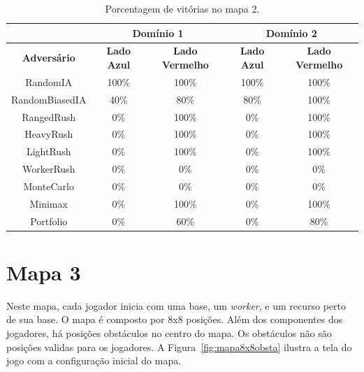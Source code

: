 \begin{table}[ht]
	\centering
	\caption{Porcentagem de vitórias no mapa 2.}
	\label{tab:mapa2}
	\begin{tabular}{|c|cc|cc|}
		\hline
		\textbf{}           & \multicolumn{2}{c|}{\textbf{Domínio 1}}  & \multicolumn{2}{c|}{\textbf{Domínio 2}}  \\ \hline
		\textbf{Adversário} & \textbf{Lado Azul} & \textbf{Lado Vermelho} & \textbf{Lado Azul} & \textbf{Lado Vermelho} \\ \hline
		RandomIA            & 100\%              & 100\%                  & 100\%              & 100\%                  \\ \hline
		RandomBiasedIA      & 40\%               & 80\%                   & 80\%               & 100\%                  \\ \hline
		RangedRush          & 0\%                & 100\%                  & 0\%                & 100\%                  \\ \hline
		HeavyRush           & 0\%                & 100\%                  & 0\%                & 100\%                  \\ \hline
		LightRush           & 0\%                & 100\%                  & 0\%                & 100\%                  \\ \hline
		WorkerRush          & 0\%                & 0\%                    & 0\%                & 0\%                    \\ \hline
		MonteCarlo          & 0\%                & 0\%                    & 0\%                & 0\%                    \\ \hline
		Minimax             & 0\%                & 100\%                  & 0\%                & 100\%                  \\ \hline
		Portfolio           & 0\%                & 60\%                  & 0\%                & 80\%                  \\ \hline
	\end{tabular}
\end{table}

\section{Mapa 3}

Neste mapa, cada jogador inicia com uma base, um \textit{worker}, e um recurso perto de sua base.
O mapa é composto por 8x8 posições.
Além dos componentes dos jogadores, há posições obstáculos no centro do mapa.
Os obstáculos não são posições validas para os jogadores.
A Figura~\ref{fig:mapa8x8obsta} ilustra a tela do jogo com a configuração inicial do mapa.

